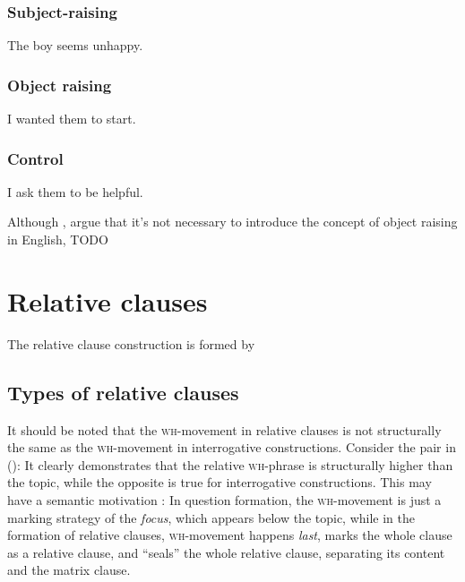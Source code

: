 \documentclass[UTF8, a4paper, oneside, scheme=plain]{ctexrep}
\newcommand*{\citepage}[1]{pp.~{#1}}
\newcommand{\corpuscat}[1]{\textsc{#1}}
\begin{document}
\subsubsection{Subject-raising}

\begin{exe}
    \ex The boy seems unhappy.
\end{exe}

\subsubsection{Object raising}

\begin{exe}
    \ex I wanted them to start.
\end{exe}

\subsubsection{Control}

\begin{exe}
    \ex I ask them to be helpful.
\end{exe}

Although \citet[\citepage{15}]{dixon2005semantic}, \citet[\citepage{388}]{dixon2010basic2} argue that 
it's not necessary to introduce the concept of object raising in English, TODO

\section{Relative clauses}\label{sec:relative-clause}

The relative clause construction is formed by 

\subsection{Types of relative clauses}

It should be noted that the \corpuscat{wh}-movement in relative clauses 
is not structurally the same as the \corpuscat{wh}-movement in interrogative constructions.
Consider the pair in ():
It clearly demonstrates that the relative \corpuscat{wh}-phrase 
is structurally higher than the topic,
while the opposite is true for interrogative constructions.
This may have a semantic motivation \citet[\citepage{330}]{radford2009analysing}:
In question formation, the \corpuscat{wh}-movement is just a marking strategy of the \emph{focus},
which appears below the topic,
while in the formation of relative clauses,
\corpuscat{wh}-movement happens \emph{last},
marks the whole clause as a relative clause, 
and ``seals'' the whole relative clause,
separating its content and the matrix clause.
\end{document}
